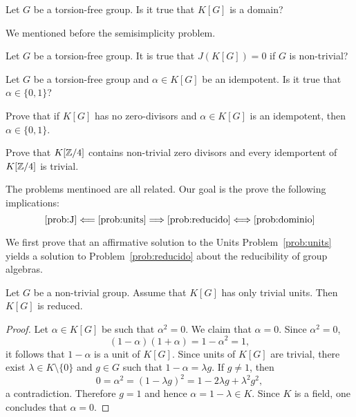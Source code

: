 \begin{problem}
	\label{prob:dominio}
	Let $G$ be a torsion-free group. Is it true that 
	$K[G]$ is a domain?
\end{problem}

We mentioned before the semisimplicity problem. 

\begin{problem}[Semisimplicity]
	\label{prob:J}
	Let $G$ be a torsion-free group. It is true that 
	$J(K[G])=0$ if $G$ is non-trivial?
\end{problem}

\begin{problem}[Idempotents]
	\label{pro:idempotente}
	Let $G$ be a torsion-free group and $\alpha\in K[G]$ be an idempotent. 
	Is it true that $\alpha\in\{0,1\}$?
\end{problem}

\begin{exercise}
	Prove that if $K[G]$ has no zero-divisors and $\alpha\in K[G]$ is an
	idempotent, then $\alpha\in\{0,1\}$.
\end{exercise}

\begin{exercise}
	Prove that $K[\mathbb{Z}/4]$ contains non-trivial zero divisors and every
	idemportent of $K[\mathbb{Z}/4]$ is trivial. 
\end{exercise}



The problems mentinoed are all related. Our goal is the prove
the following implications:
\[
	\ref{prob:J}\Longleftarrow\ref{prob:units}\Longrightarrow\ref{prob:reducido}\Longleftrightarrow\ref{prob:dominio}
\]

We first prove that an affirmative solution to the Units
Problem~\ref{prob:units} yields a solution to Problem~\ref{prob:reducido}
about the reducibility of group algebras.

\begin{theorem}
	Let $G$ be a non-trivial group. Assume that $K[G]$ has only trivial units.
	Then $K[G]$ is reduced. 
\end{theorem}

\begin{proof}
	Let $\alpha\in K[G]$ be such that $\alpha^2=0$. We claim that 
	$\alpha=0$. Since $\alpha^2=0$, 
	\[
		(1-\alpha)(1+\alpha)=1-\alpha^2=1, 
	\]
	it follows that $1-\alpha$ is a unit of $K[G]$. Since units of $K[G]$ are 
	trivial, there exist $\lambda\in K\setminus\{0\}$ and $g\in G$ such that 
	$1-\alpha=\lambda g$. If $g\ne 1$, then 
	\[
		0=\alpha^2=(1-\lambda g)^2=1-2\lambda g+\lambda^2g^2,
	\]
	a contradiction. Therefore $g=1$ and hence $\alpha=1-\lambda\in K$. Since
	$K$ is a field, one concludes that $\alpha=0$.
\end{proof}

